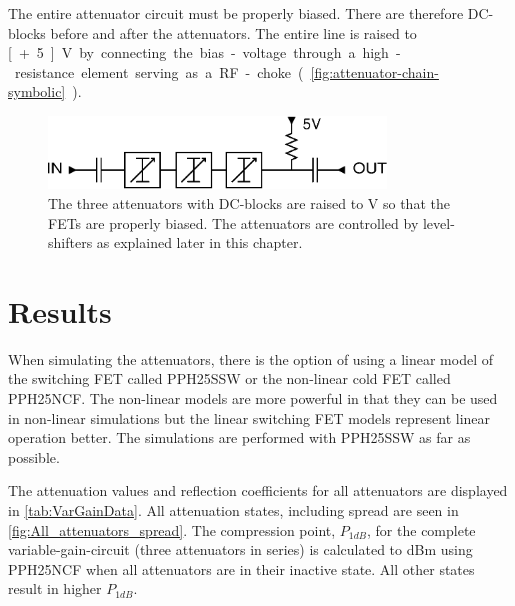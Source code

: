 
The entire attenuator circuit must be properly biased. There are therefore DC-blocks before and after the attenuators. The entire line is raised to \unit[+5]{V} by connecting the bias-voltage through a high-resistance element serving as a RF-choke (\autoref{fig:attenuator-chain-symbolic}).

		\begin{figure}[h!]
			\centering
			\includegraphics[width=0.8\textwidth]{fig/attenuators/attenuator-chain-symbolic}
			\caption[The attenuator-circuit schematically]{The three attenuators with DC-blocks are raised to \unit[5]{V} so that the FETs are properly biased. The attenuators are controlled by level-shifters as explained later in this chapter.}\label{fig:attenuator-chain-symbolic}
		\end{figure}

	
	\section{Results}
		
		When simulating the attenuators, there is the option of using a linear model of the switching FET called PPH25SSW or the non-linear cold FET called PPH25NCF. The non-linear models are more powerful in that they can be used in non-linear simulations but the linear switching FET  models represent linear operation better. The simulations are performed with PPH25SSW as far as possible.		
		
		The attenuation values and reflection coefficients for all attenuators are displayed in \autoref{tab:VarGainData}. All attenuation states, including spread are seen in \autoref{fig:All_attenuators_spread}. The compression point, $P_{1dB}$, for the complete variable-gain-circuit (three attenuators in series) is calculated to \unit[22]{dBm} using PPH25NCF when all attenuators are in their inactive state. All other states result in higher $P_{1dB}$.
	
	
	
